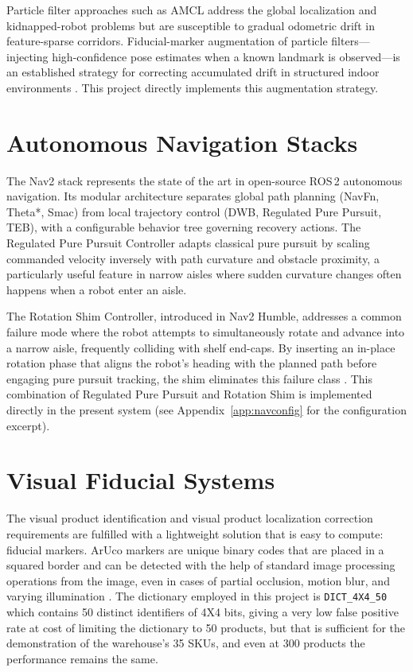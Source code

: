 \documentclass[12pt,a4paper]{report}
\begin{document}
Particle filter approaches such as AMCL \citep{thrun2005} address the global localization and kidnapped-robot problems but are susceptible to gradual odometric drift in feature-sparse corridors. Fiducial-marker augmentation of particle filters—injecting high-confidence pose estimates when a known landmark is observed—is an established strategy for correcting accumulated drift in structured indoor environments \citep{olson2011}. This project directly implements this augmentation strategy.

\section{Autonomous Navigation Stacks}

The Nav2 stack \citep{macenski2020nav2} represents the state of the art in open-source ROS\,2 autonomous navigation. Its modular architecture separates global path planning (NavFn, Theta*, Smac) from local trajectory control (DWB, Regulated Pure Pursuit, TEB), with a configurable behavior tree governing recovery actions. The Regulated Pure Pursuit Controller \citep{coulter1992} adapts classical pure pursuit by scaling commanded velocity inversely with path curvature and obstacle proximity, a particularly useful feature in narrow aisles where sudden curvature changes often happens when a robot enter an aisle.

The Rotation Shim Controller, introduced in Nav2 Humble, addresses a common failure mode where the robot attempts to simultaneously rotate and advance into a narrow aisle, frequently colliding with shelf end-caps. By inserting an in-place rotation phase that aligns the robot's heading with the planned path before engaging pure pursuit tracking, the shim eliminates this failure class \citep{macenski2022rpp}. This combination of Regulated Pure Pursuit and Rotation Shim is implemented directly in the present system (see Appendix~\ref{app:navconfig} for the configuration excerpt).

\section{Visual Fiducial Systems}

The visual product identification and visual product localization correction requirements are fulfilled with a lightweight solution that is easy to compute: fiducial markers. ArUco markers are unique binary codes that are placed in a squared border and can be detected with the help of standard image processing operations from the image, even in cases of partial occlusion, motion blur, and varying illumination \citep{garrido2014}. The dictionary employed in this project is \texttt{DICT\_4X4\_50} which contains 50 distinct identifiers of 4X4 bits, giving a very low false positive rate at cost of limiting the dictionary to 50 products, but that is sufficient for the demonstration of the warehouse's 35 SKUs, and even at 300 products the performance remains the same.
\end{document}
